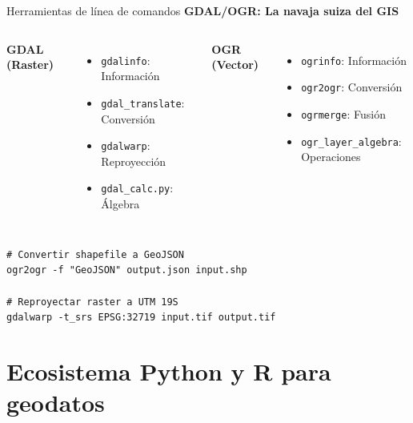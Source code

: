 \documentclass[10pt]{beamer}
\begin{document}
\begin{frame}{Herramientas de línea de comandos}
    \textbf{GDAL/OGR: La navaja suiza del GIS}
    
    \begin{columns}
        \textbf{GDAL (Raster)}
        \begin{itemize}
            \item \texttt{gdalinfo}: Información
            \item \texttt{gdal\_translate}: Conversión
            \item \texttt{gdalwarp}: Reproyección
            \item \texttt{gdal\_calc.py}: Álgebra
        \end{itemize}
        
        \textbf{OGR (Vector)}
        \begin{itemize}
            \item \texttt{ogrinfo}: Información
            \item \texttt{ogr2ogr}: Conversión
            \item \texttt{ogrmerge}: Fusión
            \item \texttt{ogr\_layer\_algebra}: Operaciones
        \end{itemize}
    \end{columns}
    
    \vspace{0.3cm}
    \begin{tcolorbox}[colframe=gray!50]
        \small
        \texttt{\# Convertir shapefile a GeoJSON\\
        ogr2ogr -f "GeoJSON" output.json input.shp\\
        \\
        \# Reproyectar raster a UTM 19S\\
        gdalwarp -t\_srs EPSG:32719 input.tif output.tif}
    \end{tcolorbox}
\end{frame}

\section{Ecosistema Python y R para geodatos}
\end{document}
